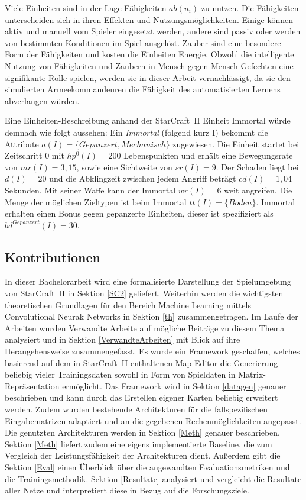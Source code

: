 Viele Einheiten sind in der Lage Fähigkeiten $ab(u_i)$ zu nutzen. Die Fähigkeiten unterscheiden sich in ihren Effekten und Nutzungsmöglichkeiten. Einige können aktiv und manuell vom Spieler eingesetzt werden, andere sind passiv oder werden von bestimmten Konditionen im Spiel ausgelöst. Zauber sind eine besondere Form der Fähigkeiten und kosten die Einheiten Energie. Obwohl die intelligente Nutzung von Fähigkeiten und Zaubern in Mensch-gegen-Mensch Gefechten eine signifikante Rolle spielen, werden sie in dieser Arbeit vernachlässigt, da sie den simulierten Armeekommandeuren die Fähigkeit des automatisierten Lernens abverlangen würden.

Eine Einheiten-Beschreibung anhand der StarCraft~II Einheit Immortal würde demnach wie folgt aussehen:
Ein \textit{Immortal} (folgend kurz I) bekommt die Attribute $a(I) = \{ Gepanzert, Mechanisch \}$ zugewiesen. Die Einheit startet bei Zeitschritt 0 mit $hp^0(I) = 200$ Lebenspunkten und erhält eine Bewegungsrate von $mr(I) = 3,15$, sowie eine Sichtweite von $sr(I) = 9$. Der Schaden liegt bei $d(I) = 20$ und die Abklingzeit zwischen jedem Angriff beträgt $cd(I) = 1,04$ Sekunden. Mit seiner Waffe kann der Immortal $wr(I) = 6$ weit angreifen. Die Menge der möglichen Zieltypen ist beim Immortal $tt(I) = \{ Boden \}$. Immortal erhalten einen Bonus gegen gepanzerte Einheiten, dieser ist spezifiziert als $bd^{Gepanzert}(I) = 30$. 

\subsection{Kontributionen}

In dieser Bachelorarbeit wird eine formalisierte Darstellung der Spielumgebung von StarCraft~II in Sektion \ref{SC2} geliefert. Weiterhin werden die wichtigsten theoretischen Grundlagen für den Bereich Machine Learning mittels Convolutional Neurak Networks in Sektion \ref{th} zusammengetragen. Im Laufe der Arbeiten wurden Verwandte Arbeite auf mögliche Beiträge zu diesem Thema analysiert und in Sektion \ref{VerwandteArbeiten} mit Blick auf ihre Herangehensweise zusammengefasst. Es wurde ein Framework geschaffen, welches basierend auf dem in StarCraft~II enthaltenen Map-Editor die Generierung beliebig vieler Trainingsdaten sowohl in Form von Spieldaten in Matrix-Repräsentation ermöglicht. Das Framework wird in Sektion \ref{datagen} genauer beschrieben und kann durch das Erstellen eigener Karten beliebig erweitert werden. Zudem wurden bestehende Architekturen für die fallspezifischen Eingabematrizen adaptiert und an die gegebenen Rechenmöglichkeiten angepasst. Die genutzten Architekturen werden in Sektion \ref{Meth} genauer beschrieben. Sektion \ref{Meth} liefert zudem eine eigens implementierte Baseline, die zum Vergleich der Leistungsfähigkeit der Architekturen dient. Außerdem gibt die Sektion \ref{Eval} einen Überblick über die angewandten Evaluationsmetriken und die Trainingsmethodik. Sektion \ref{Resultate} analysiert und vergleicht die Resultate aller Netze und interpretiert diese in Bezug auf die Forschungsziele. 
